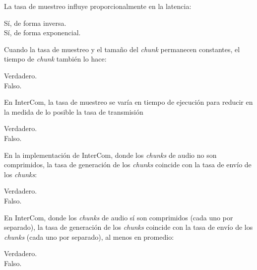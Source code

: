 \documentclass[legalpaper, 12pt, addpoints]{exam}
\begin{document}
\begin{questions}
\vspace{0.10in}

\question La tasa de muestreo influye proporcionalmente en la latencia:

\begin{oneparchoices}
  \choice Sí, de forma inversa.\\
  \choice Sí, de forma exponencial.
\end{oneparchoices}
  
\vspace{0.10in}

\question Cuando la tasa de muestreo y el tamaño del \emph{chunk}
permanecen constantes, el tiempo de \emph{chunk} también lo hace:

\begin{oneparchoices}
  \choice Verdadero.\\
  \choice Falso.
\end{oneparchoices}
  
\vspace{0.10in}

\question En InterCom, la tasa de muestreo se varía en tiempo de
ejecución para reducir en la medida de lo posible la tasa de
transmisión

\begin{oneparchoices}
  \choice Verdadero.\\
  \choice Falso.
\end{oneparchoices}
  
\vspace{0.10in}

\question En la implementación de InterCom, donde los \emph{chunks} de
audio no son comprimidos, la tasa de generación de los \emph{chunks}
coincide con la tasa de envío de los \emph{chunks}:

\begin{oneparchoices}
  \choice Verdadero.\\
  \choice Falso.
\end{oneparchoices}
  
\vspace{0.10in}

\question En InterCom, donde los \emph{chunks} de audio sí son
comprimidos (cada uno por separado), la tasa de generación de los
\emph{chunks} coincide con la tasa de envío de los \emph{chunks} (cada
uno por separado), al menos en promedio:

\begin{oneparchoices}
  \choice Verdadero.\\
  \choice Falso.
\end{oneparchoices}
  

\end{questions}
\end{document}
